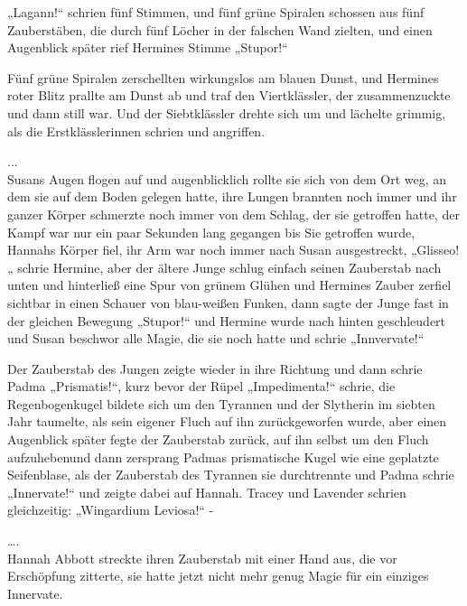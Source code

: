 {„Lagann!“ schrien fünf Stimmen, und fünf grüne Spiralen schossen aus fünf Zauberstäben, die durch fünf Löcher in der falschen Wand zielten, und einen Augenblick später rief Hermines Stimme „Stupor!“

Fünf grüne Spiralen zerschellten wirkungslos am blauen Dunst, und Hermines roter Blitz prallte am Dunst ab und traf den Viertklässler, der zusammenzuckte und dann still war. Und der Siebtklässler drehte sich um und lächelte grimmig, als die Erstklässlerinnen schrien und angriffen.

...\\ Susans Augen flogen auf und augenblicklich rollte sie sich von dem Ort weg, an dem sie auf dem Boden gelegen hatte, ihre Lungen brannten noch immer und ihr ganzer Körper schmerzte noch immer von dem Schlag, der sie getroffen hatte, der Kampf war nur ein paar Sekunden lang gegangen bis Sie getroffen wurde, Hannahs Körper fiel, ihr Arm war noch immer nach Susan ausgestreckt, „Glisseo! „ schrie Hermine, aber der ältere Junge schlug einfach seinen Zauberstab nach unten und hinterließ eine Spur von grünem Glühen und Hermines Zauber zerfiel sichtbar in einen Schauer von blau-weißen Funken, dann sagte der Junge fast in der gleichen Bewegung „Stupor!“ und Hermine wurde nach hinten geschleudert und Susan beschwor alle Magie, die sie noch hatte und schrie „Innvervate!“

Der Zauberstab des Jungen zeigte wieder in ihre Richtung und dann schrie Padma „Prismatis!“, kurz bevor der Rüpel „Impedimenta!“ schrie, die Regenbogenkugel bildete sich um den Tyrannen und der Slytherin im siebten Jahr taumelte, als sein eigener Fluch auf ihn zurückgeworfen wurde, aber einen Augenblick später fegte der Zauberstab zurück, auf ihn selbst um den Fluch aufzuhebenund dann zersprang Padmas prismatische Kugel wie eine geplatzte Seifenblase, als der Zauberstab des Tyrannen sie durchtrennte und Padma schrie „Innervate!“ und zeigte dabei auf Hannah. Tracey und Lavender schrien gleichzeitig: „Wingardium Leviosa!“ -

….\\ Hannah Abbott streckte ihren Zauberstab mit einer Hand aus, die vor Erschöpfung zitterte, sie hatte jetzt nicht mehr genug Magie für ein einziges Innervate.

}
